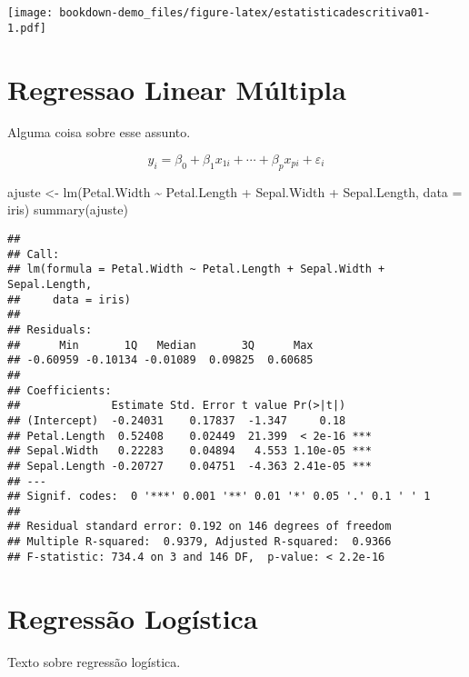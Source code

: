\documentclass[
]{book}
\newenvironment{Shaded}{\begin{snugshade}}{\end{snugshade}}
\newcommand{\AttributeTok}[1]{\textcolor[rgb]{0.77,0.63,0.00}{#1}}
\newcommand{\FunctionTok}[1]{\textcolor[rgb]{0.00,0.00,0.00}{#1}}
\newcommand{\NormalTok}[1]{#1}
\newcommand{\OtherTok}[1]{\textcolor[rgb]{0.56,0.35,0.01}{#1}}
\newcommand{\SpecialCharTok}[1]{\textcolor[rgb]{0.00,0.00,0.00}{#1}}
\begin{document}
\texttt{[image: bookdown-demo\_files/figure-latex/estatisticadescritiva01-1.pdf]}

\hypertarget{regressaolinearmultipla}{%
\chapter*{Regressao Linear Múltipla}\label{regressaolinearmultipla}}

Alguma coisa sobre esse assunto.

\[y_i = \beta_0 + \beta_1x_{1i} + \cdots + \beta_px_{pi} + \varepsilon_i\]

\begin{Shaded}
\begin{Highlighting}[]
\NormalTok{ajuste }\OtherTok{\textless{}{-}} \FunctionTok{lm}\NormalTok{(Petal.Width }\SpecialCharTok{\textasciitilde{}}\NormalTok{ Petal.Length }\SpecialCharTok{+}\NormalTok{ Sepal.Width }\SpecialCharTok{+}\NormalTok{ Sepal.Length, }
             \AttributeTok{data =}\NormalTok{ iris)}
\FunctionTok{summary}\NormalTok{(ajuste)}
\end{Highlighting}
\end{Shaded}

\begin{verbatim}
## 
## Call:
## lm(formula = Petal.Width ~ Petal.Length + Sepal.Width + Sepal.Length, 
##     data = iris)
## 
## Residuals:
##      Min       1Q   Median       3Q      Max 
## -0.60959 -0.10134 -0.01089  0.09825  0.60685 
## 
## Coefficients:
##              Estimate Std. Error t value Pr(>|t|)    
## (Intercept)  -0.24031    0.17837  -1.347     0.18    
## Petal.Length  0.52408    0.02449  21.399  < 2e-16 ***
## Sepal.Width   0.22283    0.04894   4.553 1.10e-05 ***
## Sepal.Length -0.20727    0.04751  -4.363 2.41e-05 ***
## ---
## Signif. codes:  0 '***' 0.001 '**' 0.01 '*' 0.05 '.' 0.1 ' ' 1
## 
## Residual standard error: 0.192 on 146 degrees of freedom
## Multiple R-squared:  0.9379, Adjusted R-squared:  0.9366 
## F-statistic: 734.4 on 3 and 146 DF,  p-value: < 2.2e-16
\end{verbatim}

\hypertarget{regressaologistica}{%
\chapter*{Regressão Logística}\label{regressaologistica}}

Texto sobre regressão logística.
\end{document}
